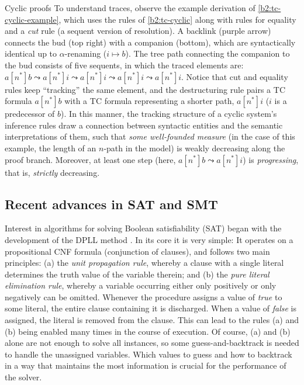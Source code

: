 \begin{paragraph}{Cyclic proofs}
To understand traces, observe the example derivation of \autoref{b2:tc-cyclic-example}, which uses the rules of \autoref{b2:tc-cyclic} along with rules for equality and a \emph{cut} rule (a sequent version of resolution).
A backlink (purple arrow) connects the bud (top right) with a companion (bottom), which are syntactically identical up to $\alpha$-renaming ($i\mapsto b$).
The tree path connecting the companion to the bud consists of five sequents, in which the traced elements are:
$a[n^*]b\leadsto a[n^*]i\leadsto a[n^*]i\leadsto a[n^*]i\leadsto a[n^*]i$.
Notice that cut and equality rules keep ``tracking'' the same element, and the destructuring rule {} pairs a TC formula $a[n^*]b$ with a TC formula representing a shorter path, $a[n^*]i$ ($i$ is a predecessor of $b$).
In this manner, the tracking structure of a cyclic system's inference rules draw a connection between syntactic entities and the semantic interpretations of them, such that \emph{some well-founded measure} (in the case of this example, the length of an $n$-path in the model) is weakly decreasing along the proof branch.
Moreover, at least one step (here, $a[n^*]b\leadsto a[n^*]i$) is \emph{progressing}, that is, \emph{strictly} decreasing.
\end{paragraph}


\subsection{Recent advances in SAT and SMT}



Interest in algorithms for solving Boolean satisfiability (SAT) began with the development of the DPLL method \cite{DPLL1,DPLL2}.
In its core it is very simple:
It operates on a propositional CNF formula (conjunction of clauses), and follows two main principles:
(a) the \emph{unit propagation rule}, whereby a clause with a single literal determines the truth value of the variable therein; and
(b) the \emph{pure literal elimination rule}, whereby a variable occurring either only positively or only negatively can be omitted.
Whenever the procedure assigns a value of \emph{true} to some literal, the entire clause containing it is discharged.
When a value of \emph{false} is assigned, the literal is removed from the clause.
This can lead to the rules (a) and (b) being enabled many times in the course of execution.
Of course, (a) and (b) alone are not enough to solve all instances, so some guess-and-backtrack is needed to handle the unassigned variables.
Which values to guess and how to backtrack in a way that maintains the most information is crucial for the performance of the solver.

